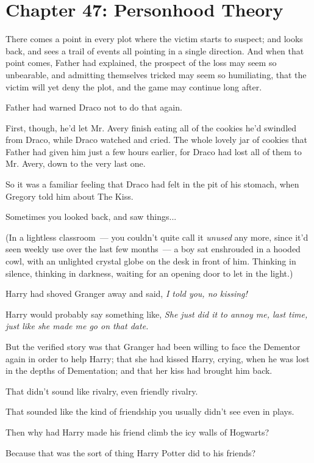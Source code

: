 \chapter{Chapter 47: Personhood Theory}
There comes a point in every plot where the victim starts to suspect; and looks back, and sees a trail of events all pointing in a single direction. And when that point comes, Father had explained, the prospect of the loss may seem so unbearable, and admitting themselves tricked may seem so humiliating, that the victim will yet deny the plot, and the game may continue long after.

Father had warned Draco not to do that again.

First, though, he'd let Mr. Avery finish eating all of the cookies he'd swindled from Draco, while Draco watched and cried. The whole lovely jar of cookies that Father had given him just a few hours earlier, for Draco had lost all of them to Mr. Avery, down to the very last one.

So it was a familiar feeling that Draco had felt in the pit of his stomach, when Gregory told him about The Kiss.

Sometimes you looked back, and saw things...

(In a lightless classroom~--- you couldn't quite call it \emph{unused} any more, since it'd seen weekly use over the last few months~--- a boy sat enshrouded in a hooded cowl, with an unlighted crystal globe on the desk in front of him. Thinking in silence, thinking in darkness, waiting for an opening door to let in the light.)

Harry had shoved Granger away and said, \emph{I told you, no kissing!}

Harry would probably say something like, \emph{She just did it to annoy me, last time, just like she made me go on that date.}

But the verified story was that Granger had been willing to face the Dementor again in order to help Harry; that she had kissed Harry, crying, when he was lost in the depths of Dementation; and that her kiss had brought him back.

That didn't sound like rivalry, even friendly rivalry.

That sounded like the kind of friendship you usually didn't see even in plays.

Then why had Harry made his friend climb the icy walls of Hogwarts?

Because that was the sort of thing Harry Potter did to his friends?

